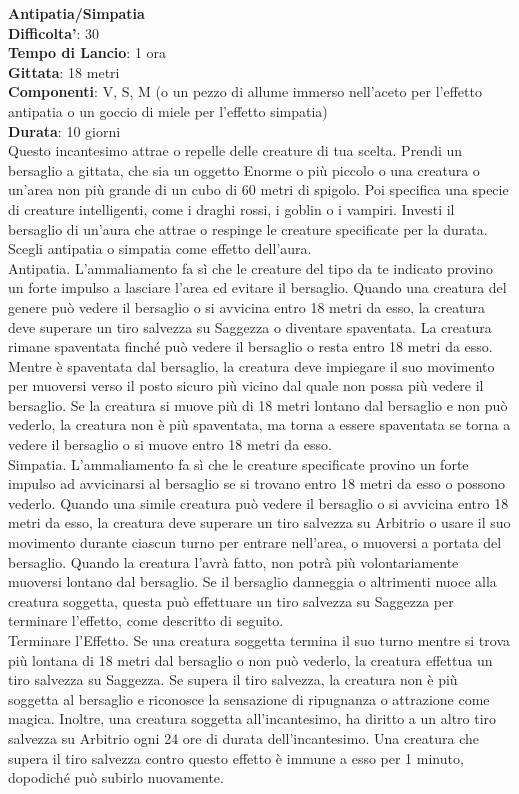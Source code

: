 \begin{multicols}{2}
\medskip\textbf{Antipatia/Simpatia}\\
\textbf{Difficolta'}: 30\\
\textbf{Tempo di Lancio}: 1 ora\\
\textbf{Gittata}: 18 metri\\
\textbf{Componenti}: V, S, M (o un pezzo di allume immerso nell’aceto per l’effetto antipatia o un goccio di miele per l’effetto simpatia)\\
\textbf{Durata}: 10 giorni\\
Questo incantesimo attrae o repelle delle creature di tua scelta. Prendi un bersaglio a gittata, che sia un oggetto Enorme o più piccolo o una creatura o un’area non più grande di un cubo di 60 metri di spigolo. Poi specifica una specie di creature intelligenti, come i draghi rossi, i goblin o i vampiri. Investi il bersaglio di un’aura che attrae o respinge le creature specificate per la durata. Scegli antipatia o simpatia come effetto dell’aura.\\
Antipatia. L’ammaliamento fa sì che le creature del tipo da te indicato provino un forte impulso a lasciare l’area ed evitare il bersaglio. Quando una creatura del genere può vedere il bersaglio o si avvicina entro 18 metri da esso, la creatura deve superare un tiro salvezza su Saggezza o diventare spaventata. La creatura rimane spaventata finché può vedere il bersaglio o resta entro 18 metri da esso. Mentre è spaventata dal bersaglio, la creatura deve impiegare il suo movimento per muoversi verso il posto sicuro più vicino dal quale non possa più vedere il bersaglio. Se la creatura si muove più di 18 metri lontano dal bersaglio e non può vederlo, la creatura non è più spaventata, ma torna a essere spaventata se torna a vedere il bersaglio o si muove entro 18 metri da esso.\\
Simpatia. L’ammaliamento fa sì che le creature specificate provino un forte impulso ad avvicinarsi al bersaglio se si trovano entro 18 metri da esso o possono vederlo. Quando una simile creatura può vedere il bersaglio o si avvicina entro 18 metri da esso, la creatura deve superare un tiro salvezza su Arbitrio o usare il suo movimento durante ciascun turno per
entrare nell’area, o muoversi a portata del bersaglio. Quando la creatura l’avrà fatto, non potrà più volontariamente muoversi lontano dal bersaglio. Se il bersaglio danneggia o altrimenti nuoce alla creatura soggetta, questa può effettuare un tiro  salvezza su Saggezza per terminare l’effetto, come descritto di seguito.\\
Terminare l’Effetto. Se una creatura soggetta termina il suo turno mentre si trova più lontana di 18 metri dal bersaglio o non può vederlo, la creatura effettua un tiro salvezza su Saggezza. Se supera il tiro salvezza, la creatura non è più soggetta al bersaglio e riconosce la sensazione di ripugnanza o attrazione come magica. Inoltre, una creatura soggetta all’incantesimo, ha diritto a un altro tiro salvezza su Arbitrio ogni 24 ore di durata dell’incantesimo. Una creatura che supera il tiro salvezza contro questo effetto è immune a esso per 1 minuto, dopodiché può subirlo nuovamente.


\end{multicols}
